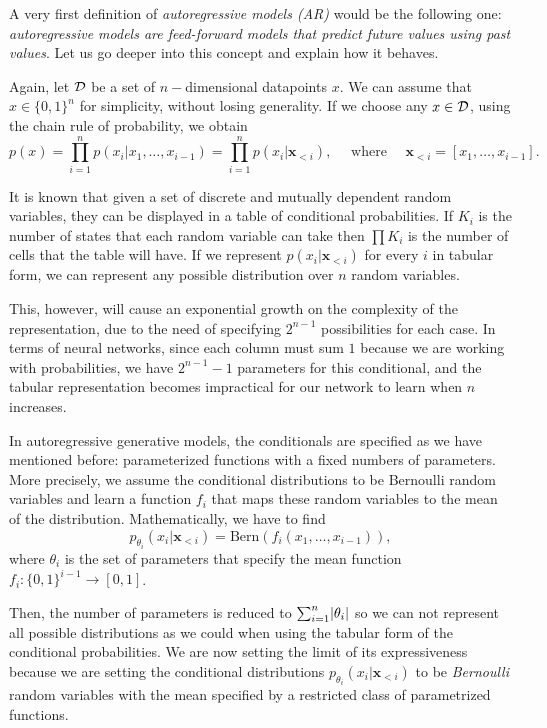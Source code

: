 A very first definition of \emph{autoregressive models (AR)} would be the following one: \emph{autoregressive models are feed-forward models that predict future values using past values}. Let us go deeper into this 
concept and explain how it behaves.

Again, let $\mathcal{D}$ be a set of $n-$dimensional datapoints $x$. We can assume that $x \in \{0,1\}^n$ for simplicity, without losing generality. If we choose any $x\in \mathcal{D}$, using the chain rule of probability, we obtain
$$
p(x) = \prod_{i=1} ^n p(x_i | x_1,\dots,x_{i-1}) = \prod_{i = 1}^n p(x_i|\bm{x}_{<i}), \quad  \text{ where }  \quad \bm{x}_{<i} = [x_1,\dots, x_{i-1}].
$$

It is known that given a set of discrete and mutually dependent random variables, they can be displayed in a table of conditional probabilities. If $K_i$ is the number of states that each random variable can take
then $\prod K_i$ is the number of cells that the table will have. If we represent $p(x_i|\bm{x}_{<i})$ for every $i$ in tabular form, we can represent
any possible distribution over $n$ random variables. 

This, however, will cause an exponential growth on the complexity of the representation, due to the need of specifying $2^{n-1}$ possibilities 
for each case. In terms of neural networks, since each column must sum $1$ because we are working with probabilities, we have $2^{n-1}-1$ parameters for this conditional, and the tabular representation
becomes impractical for our network to learn when $n$ increases.

In autoregressive generative models, the conditionals are specified as we have mentioned before: parameterized functions with a fixed numbers of parameters. More precisely,  we assume 
the conditional distributions to be Bernoulli random variables and learn a function $f_i$ that maps these random variables to the mean of the distribution. Mathematically, we have to find 
$$
p_{\theta_i}(x_i | \bm{x}_{<i}) = \text{Bern}(f_i(x_1,\dots,x_{i-1})),
$$
where $\theta_i$ is the set of parameters that specify the mean function $f_i:\{0,1\}^{i-1} \to [0,1]$.

Then, the number of parameters is reduced to $\sum_{i=1}^n \lvert\theta_i\rvert$ so we can not represent all possible distributions as we could when using the tabular form of the conditional probabilities.
We are now setting the limit of its expressiveness because we are setting the conditional distributions $p_{\theta_i}(x_i|\bm{x}_{<i})$ to be \emph{Bernoulli} random variables with the mean specified by a restricted class 
of parametrized functions. 

